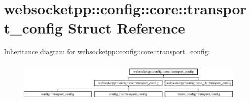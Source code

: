 \hypertarget{structwebsocketpp_1_1config_1_1core_1_1transport__config}{}\section{websocketpp\+:\+:config\+:\+:core\+:\+:transport\+\_\+config Struct Reference}
\label{structwebsocketpp_1_1config_1_1core_1_1transport__config}
Inheritance diagram for websocketpp\+:\+:config\+:\+:core\+:\+:transport\+\_\+config\+:\begin{figure}[H]
\begin{center}
\leavevmode
\includegraphics[height=2.000000cm]{structwebsocketpp_1_1config_1_1core_1_1transport__config}
\end{center}
\end{figure}
